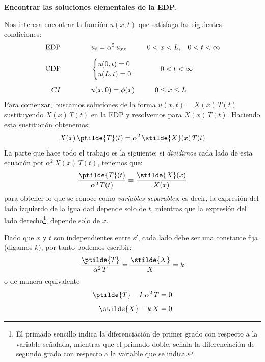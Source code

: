 \textbf{Encontrar las soluciones elementales de la EDP.}

Nos interesa encontrar la función $u(x, t)$ que satisfaga las siguientes condiciones:
\begin{align*}
\mbox{EDP} \hspace{1.5cm} &u_{t} = \alpha^{2} \, u_{xx} \hspace{1cm} 0 < x < L, \hspace{0.3cm} 0 < t < \infty \\[0.5em] 
\mbox{CDF} \hspace{1.5cm} &\begin{cases}
    u(0, t) = 0 \\
    u(L, t) = 0
    \end{cases}
    \hspace{1cm}
    0 < t < \infty \\[0.5em]
CI \hspace{1.5cm} & u(x, 0) = \phi (x) \hspace{1cm} 0 \leq x \leq L
\end{align*}
Para comenzar, buscamos soluciones de la forma $u (x, t) = X(x) \, T (t)$ sustituyendo $X (x) \, T (t)$ en la EDP y resolvemos para  $X (x) \, T (t)$. Haciendo esta sustitución obtenemos:
\begin{align*}
X(x) \, \ptilde{T} (t) = \alpha^{2} \, \stilde{X} (x) \, T(t)
\end{align*}
La parte que hace todo el trabajo es la siguiente: si \emph{dividimos} cada lado de esta ecuación por $\alpha^{2} \, X(x) \, T(t)$, tenemos que:
\begin{align*}
\dfrac{\ptilde{T} (t)}{\alpha^{2} \, T(t)} = \dfrac{\stilde{X} (x)}{X(x)}
\end{align*}
para obtener lo que se conoce como \emph{variables separables}, es decir, la expresión del lado izquierdo de la igualdad depende solo de $t$, mientras que la expresión del lado derecho\footnote{El primado sencillo indica la diferenciación de primer grado con respecto a la variable señalada, mientras que el primado doble, señala la diferenciación de segundo grado con respecto a la variable que se indica.}, depende solo de $x$.
\par
Dado que $x$ y $t$ son independientes entre sí, cada lado debe ser una constante fija (digamos $k$),  por tanto podemos escribir:
\begin{align*}
\dfrac{\ptilde{T}}{\alpha^{2} \, T} = \dfrac{\stilde{X}}{X} = k
\end{align*}
o de manera equivalente
\begin{align*}
\ptilde{T} - k \, \alpha^{2} \, T &= 0 \\[0.5em]
\stilde{X} - k \, X &= 0
\end{align*}
